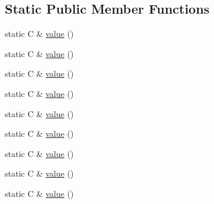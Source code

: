 \subsection*{Static Public Member Functions}
\begin{DoxyCompactItemize}
\item 
static C \& \mbox{\hyperlink{structfakeit_1_1DefaultValue_3_01C_00_01typename_01std_1_1enable__if_3_9is__constructible__type_237d75e2cfb810085e1504a1340d5949_ace6890104d79eccdf278ceb3b8d1d887}{value}} ()
\item 
static C \& \mbox{\hyperlink{structfakeit_1_1DefaultValue_3_01C_00_01typename_01std_1_1enable__if_3_9is__constructible__type_237d75e2cfb810085e1504a1340d5949_ace6890104d79eccdf278ceb3b8d1d887}{value}} ()
\item 
static C \& \mbox{\hyperlink{structfakeit_1_1DefaultValue_3_01C_00_01typename_01std_1_1enable__if_3_9is__constructible__type_237d75e2cfb810085e1504a1340d5949_ace6890104d79eccdf278ceb3b8d1d887}{value}} ()
\item 
static C \& \mbox{\hyperlink{structfakeit_1_1DefaultValue_3_01C_00_01typename_01std_1_1enable__if_3_9is__constructible__type_237d75e2cfb810085e1504a1340d5949_ace6890104d79eccdf278ceb3b8d1d887}{value}} ()
\item 
static C \& \mbox{\hyperlink{structfakeit_1_1DefaultValue_3_01C_00_01typename_01std_1_1enable__if_3_9is__constructible__type_237d75e2cfb810085e1504a1340d5949_ace6890104d79eccdf278ceb3b8d1d887}{value}} ()
\item 
static C \& \mbox{\hyperlink{structfakeit_1_1DefaultValue_3_01C_00_01typename_01std_1_1enable__if_3_9is__constructible__type_237d75e2cfb810085e1504a1340d5949_ace6890104d79eccdf278ceb3b8d1d887}{value}} ()
\item 
static C \& \mbox{\hyperlink{structfakeit_1_1DefaultValue_3_01C_00_01typename_01std_1_1enable__if_3_9is__constructible__type_237d75e2cfb810085e1504a1340d5949_ace6890104d79eccdf278ceb3b8d1d887}{value}} ()
\item 
static C \& \mbox{\hyperlink{structfakeit_1_1DefaultValue_3_01C_00_01typename_01std_1_1enable__if_3_9is__constructible__type_237d75e2cfb810085e1504a1340d5949_ace6890104d79eccdf278ceb3b8d1d887}{value}} ()
\item 
static C \& \mbox{\hyperlink{structfakeit_1_1DefaultValue_3_01C_00_01typename_01std_1_1enable__if_3_9is__constructible__type_237d75e2cfb810085e1504a1340d5949_ace6890104d79eccdf278ceb3b8d1d887}{value}} ()
\end{DoxyCompactItemize}


